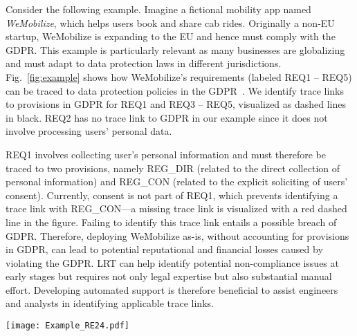 Consider the following example. Imagine a fictional mobility app named  \textit{WeMobilize}, which helps users book and share cab rides. Originally a non-EU startup, WeMobilize is expanding to the EU and hence must comply with the GDPR. 
This example is particularly relevant as many businesses are globalizing and must adapt to data protection laws in different jurisdictions. 
%
Fig.~\ref{fig:example} shows how WeMobilize's requirements (labeled REQ1 -- REQ5) can be traced to data protection policies in the GDPR~\cite{GDPR}. 
We identify trace links to provisions in GDPR for REQ1 and REQ3 -- REQ5, visualized as dashed lines in black. REQ2 has no trace link to GDPR in our example since it does not involve processing users' personal data. 

REQ1 involves collecting  user's personal information and must therefore be traced to two provisions, namely {REG\_DIR} (related to the direct collection of personal information) and REG\_CON (related to the explicit soliciting of users' consent). Currently, consent is not part of REQ1, which prevents identifying a trace link with REG\_CON---a missing trace link is visualized with a red dashed line in the figure. Failing to identify this trace link entails a possible breach of GDPR. Therefore, deploying WeMobilize as-is, without accounting for provisions in GDPR, can lead to potential reputational and financial losses caused by violating the GDPR. LRT can help identify potential non-compliance issues at early stages but requires not only legal expertise but also substantial manual effort. Developing automated support is therefore beneficial to assist engineers and analysts in identifying applicable trace links. 

\begin{figure*}
  \texttt{[image: Example\_RE24.pdf]}
  \centering
  \caption{Example on tracing WeMobilize app requirements to GDPR statements.}
  \label{fig:example}
 \vspace*{-1em}
\end{figure*}


